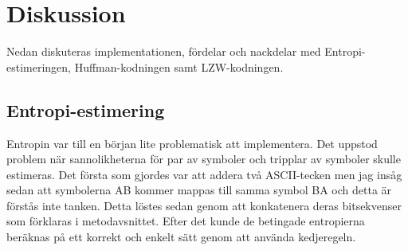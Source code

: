 
\chapter{Diskussion}
\label{cha:discussion}

Nedan diskuteras implementationen, fördelar och nackdelar med Entropi-estimeringen, Huffman-kodningen samt LZW-kodningen.

\section{Entropi-estimering}
Entropin var till en början lite problematisk att implementera. Det uppstod problem när sannolikheterna för par av symboler och tripplar av symboler skulle estimeras. Det första som gjordes var att addera två ASCII-tecken men jag insåg sedan att symbolerna AB kommer mappas till samma symbol BA och detta är förstås inte tanken. Detta löstes sedan genom att konkatenera deras bitsekvenser som förklaras i metodavsnittet. Efter det kunde de betingade entropierna beräknas på ett korrekt och enkelt sätt genom att använda kedjeregeln.

